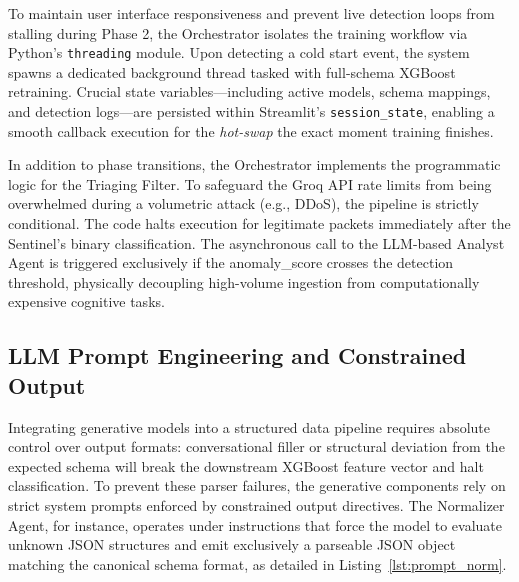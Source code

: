 \documentclass[conference]{IEEEtran}
\begin{document}
To maintain user interface responsiveness and prevent live detection loops from stalling during Phase 2, the Orchestrator isolates the training workflow via Python's \texttt{threading} module. Upon detecting a cold start event, the system spawns a dedicated background thread tasked with full-schema XGBoost retraining. Crucial state variables---including active models, schema mappings, and detection logs---are persisted within Streamlit's \texttt{session\_state}, enabling a smooth callback execution for the \textit{hot-swap} the exact moment training finishes.

In addition to phase transitions, the Orchestrator implements the programmatic logic for the Triaging Filter. To safeguard the Groq API rate limits from being overwhelmed during a volumetric attack (e.g., DDoS), the pipeline is strictly conditional. The code halts execution for legitimate packets immediately after the Sentinel's binary classification. The asynchronous call to the LLM-based Analyst Agent is triggered exclusively if the anomaly\_score crosses the detection threshold, physically decoupling high-volume ingestion from computationally expensive cognitive tasks.

\subsection{LLM Prompt Engineering and Constrained Output}
Integrating generative models into a structured data pipeline requires absolute control over output formats: conversational filler or structural deviation from the expected schema will break the downstream XGBoost feature vector and halt classification. To prevent these parser failures, the generative components rely on strict system prompts enforced by constrained output directives. The Normalizer Agent, for instance, operates under instructions that force the model to evaluate unknown JSON structures and emit exclusively a parseable JSON object matching the canonical schema format, as detailed in Listing~\ref{lst:prompt_norm}.
\end{document}
